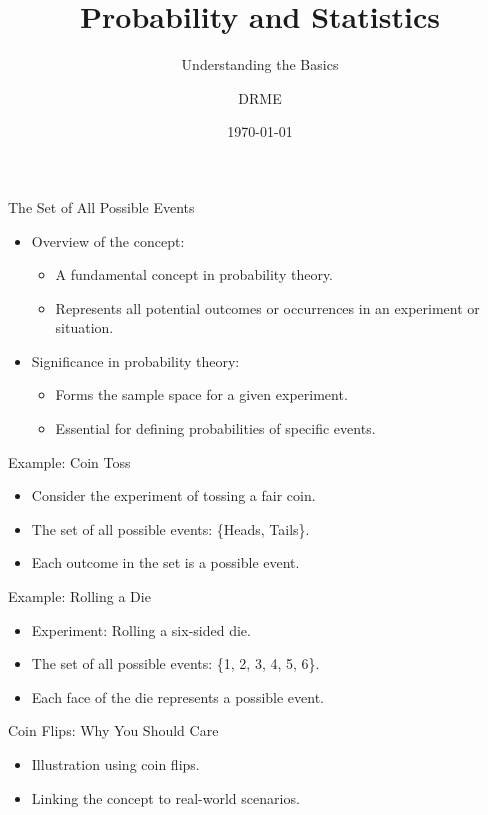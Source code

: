\documentclass{beamer}
\begin{document}
\title{Probability and Statistics}
\subtitle{Understanding the Basics}
\author{DRME}
\date{\today}

\begin{frame}
  \titlepage
\end{frame}


\begin{frame}{The Set of All Possible Events}
  \begin{itemize}
    \item Overview of the concept:
      \begin{itemize}
        \item A fundamental concept in probability theory.
        \item Represents all potential outcomes or occurrences in an experiment or situation.
      \end{itemize}
    \item Significance in probability theory:
      \begin{itemize}
        \item Forms the sample space for a given experiment.
        \item Essential for defining probabilities of specific events.
      \end{itemize}
  \end{itemize}
\end{frame}

\begin{frame}{Example: Coin Toss}
  \begin{itemize}
    \item Consider the experiment of tossing a fair coin.
    \item The set of all possible events: \{Heads, Tails\}.
    \item Each outcome in the set is a possible event.
  \end{itemize}
\end{frame}

\begin{frame}{Example: Rolling a Die}
  \begin{itemize}
    \item Experiment: Rolling a six-sided die.
    \item The set of all possible events: \{1, 2, 3, 4, 5, 6\}.
    \item Each face of the die represents a possible event.
  \end{itemize}
\end{frame}

\begin{frame}{Coin Flips: Why You Should Care}
  \begin{itemize}
    \item Illustration using coin flips.
    \item Linking the concept to real-world scenarios.
  \end{itemize}
\end{frame}
\end{document}
